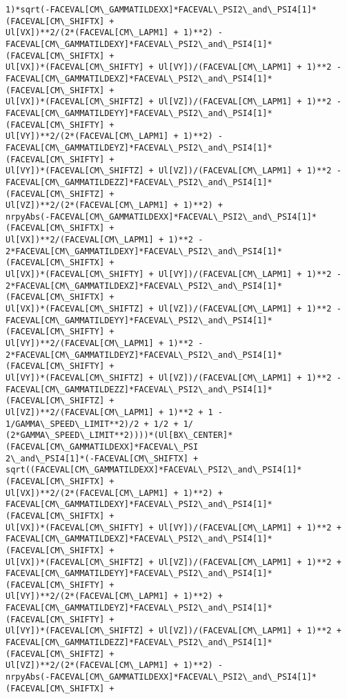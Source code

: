 \documentclass[landscape,letterpaper,10pt,english]{article}
\begin{document}
\begin{Verbatim}[commandchars=\\\{\}]
1)*sqrt(-FACEVAL[CM\_GAMMATILDEXX]*FACEVAL\_PSI2\_and\_PSI4[1]*(FACEVAL[CM\_SHIFTX] +
Ul[VX])**2/(2*(FACEVAL[CM\_LAPM1] + 1)**2) -
FACEVAL[CM\_GAMMATILDEXY]*FACEVAL\_PSI2\_and\_PSI4[1]*(FACEVAL[CM\_SHIFTX] +
Ul[VX])*(FACEVAL[CM\_SHIFTY] + Ul[VY])/(FACEVAL[CM\_LAPM1] + 1)**2 -
FACEVAL[CM\_GAMMATILDEXZ]*FACEVAL\_PSI2\_and\_PSI4[1]*(FACEVAL[CM\_SHIFTX] +
Ul[VX])*(FACEVAL[CM\_SHIFTZ] + Ul[VZ])/(FACEVAL[CM\_LAPM1] + 1)**2 -
FACEVAL[CM\_GAMMATILDEYY]*FACEVAL\_PSI2\_and\_PSI4[1]*(FACEVAL[CM\_SHIFTY] +
Ul[VY])**2/(2*(FACEVAL[CM\_LAPM1] + 1)**2) -
FACEVAL[CM\_GAMMATILDEYZ]*FACEVAL\_PSI2\_and\_PSI4[1]*(FACEVAL[CM\_SHIFTY] +
Ul[VY])*(FACEVAL[CM\_SHIFTZ] + Ul[VZ])/(FACEVAL[CM\_LAPM1] + 1)**2 -
FACEVAL[CM\_GAMMATILDEZZ]*FACEVAL\_PSI2\_and\_PSI4[1]*(FACEVAL[CM\_SHIFTZ] +
Ul[VZ])**2/(2*(FACEVAL[CM\_LAPM1] + 1)**2) +
nrpyAbs(-FACEVAL[CM\_GAMMATILDEXX]*FACEVAL\_PSI2\_and\_PSI4[1]*(FACEVAL[CM\_SHIFTX] +
Ul[VX])**2/(FACEVAL[CM\_LAPM1] + 1)**2 -
2*FACEVAL[CM\_GAMMATILDEXY]*FACEVAL\_PSI2\_and\_PSI4[1]*(FACEVAL[CM\_SHIFTX] +
Ul[VX])*(FACEVAL[CM\_SHIFTY] + Ul[VY])/(FACEVAL[CM\_LAPM1] + 1)**2 -
2*FACEVAL[CM\_GAMMATILDEXZ]*FACEVAL\_PSI2\_and\_PSI4[1]*(FACEVAL[CM\_SHIFTX] +
Ul[VX])*(FACEVAL[CM\_SHIFTZ] + Ul[VZ])/(FACEVAL[CM\_LAPM1] + 1)**2 -
FACEVAL[CM\_GAMMATILDEYY]*FACEVAL\_PSI2\_and\_PSI4[1]*(FACEVAL[CM\_SHIFTY] +
Ul[VY])**2/(FACEVAL[CM\_LAPM1] + 1)**2 -
2*FACEVAL[CM\_GAMMATILDEYZ]*FACEVAL\_PSI2\_and\_PSI4[1]*(FACEVAL[CM\_SHIFTY] +
Ul[VY])*(FACEVAL[CM\_SHIFTZ] + Ul[VZ])/(FACEVAL[CM\_LAPM1] + 1)**2 -
FACEVAL[CM\_GAMMATILDEZZ]*FACEVAL\_PSI2\_and\_PSI4[1]*(FACEVAL[CM\_SHIFTZ] +
Ul[VZ])**2/(FACEVAL[CM\_LAPM1] + 1)**2 + 1 - 1/GAMMA\_SPEED\_LIMIT**2)/2 + 1/2 + 1/
(2*GAMMA\_SPEED\_LIMIT**2))))*(Ul[BX\_CENTER]*(FACEVAL[CM\_GAMMATILDEXX]*FACEVAL\_PSI
2\_and\_PSI4[1]*(-FACEVAL[CM\_SHIFTX] +
sqrt((FACEVAL[CM\_GAMMATILDEXX]*FACEVAL\_PSI2\_and\_PSI4[1]*(FACEVAL[CM\_SHIFTX] +
Ul[VX])**2/(2*(FACEVAL[CM\_LAPM1] + 1)**2) +
FACEVAL[CM\_GAMMATILDEXY]*FACEVAL\_PSI2\_and\_PSI4[1]*(FACEVAL[CM\_SHIFTX] +
Ul[VX])*(FACEVAL[CM\_SHIFTY] + Ul[VY])/(FACEVAL[CM\_LAPM1] + 1)**2 +
FACEVAL[CM\_GAMMATILDEXZ]*FACEVAL\_PSI2\_and\_PSI4[1]*(FACEVAL[CM\_SHIFTX] +
Ul[VX])*(FACEVAL[CM\_SHIFTZ] + Ul[VZ])/(FACEVAL[CM\_LAPM1] + 1)**2 +
FACEVAL[CM\_GAMMATILDEYY]*FACEVAL\_PSI2\_and\_PSI4[1]*(FACEVAL[CM\_SHIFTY] +
Ul[VY])**2/(2*(FACEVAL[CM\_LAPM1] + 1)**2) +
FACEVAL[CM\_GAMMATILDEYZ]*FACEVAL\_PSI2\_and\_PSI4[1]*(FACEVAL[CM\_SHIFTY] +
Ul[VY])*(FACEVAL[CM\_SHIFTZ] + Ul[VZ])/(FACEVAL[CM\_LAPM1] + 1)**2 +
FACEVAL[CM\_GAMMATILDEZZ]*FACEVAL\_PSI2\_and\_PSI4[1]*(FACEVAL[CM\_SHIFTZ] +
Ul[VZ])**2/(2*(FACEVAL[CM\_LAPM1] + 1)**2) -
nrpyAbs(-FACEVAL[CM\_GAMMATILDEXX]*FACEVAL\_PSI2\_and\_PSI4[1]*(FACEVAL[CM\_SHIFTX] +

\end{Verbatim}
\end{document}
